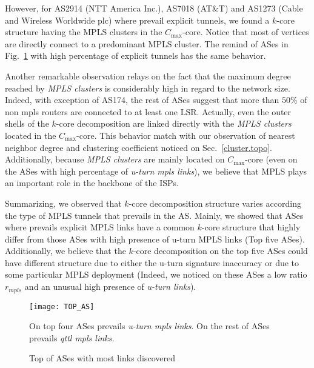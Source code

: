 However, for  AS2914 (NTT America Inc.), AS7018 (AT\&T) and AS1273 (Cable and
 Wireless Worldwide plc) where prevail explicit tunnels, we found a $k$-core
structure having the MPLS clusters in the $C_{\max}$-core. 
Notice that most of vertices are directly connect to a predominant MPLS cluster.
The remind of  ASes in Fig.~\ref{top_as} with high percentage of explicit tunnels has the same behavior.

Another remarkable observation  relays on the fact that the maximum degree
reached by \textit{MPLS clusters} is considerably high in regard to the network
size. Indeed, with exception of AS174, the rest of ASes suggest that more than
$50\%$ of non mpls routers are connected  to at least one LSR. Actually, even
the outer shells of the $k$-core decomposition are linked directly with the
\textit{MPLS clusters} located in the $C_{\max}$-core. This behavior match with
our observation of nearest neighbor degree and clustering coefficient noticed on
Sec.~\ref{cluster.topo}. Additionally, because \textit{MPLS clusters} are
mainly located on $C_{\max}$-core (even on the ASes with high percentage of
\textit{u-turn mpls links}), we believe that MPLS plays an important role in the
backbone of the ISPs.

Summarizing, we observed that  $k$-core decomposition structure varies according
the type of MPLS tunnels that prevails in the AS. Mainly, we showed that ASes where prevails 
explicit MPLS links have a common $k$-core structure that highly differ from those ASes with
high presence of u-turn MPLS links (Top five ASes). Additionally, we believe that the $k$-core decomposition  on the top five ASes could have different structure due to either  the
u-turn signature inaccuracy or due to some particular MPLS deployment (Indeed, we noticed on these
ASes a low ratio $r_{mpls}$ and an unusual  high presence of  \textit{u-turn links}).


\begin{figure}[!htb]
  \begin{center}
    \texttt{[image: TOP\_AS]}
  \end{center}
  \caption{Top of ASes with most links discovered} On top four ASes
  prevails \textit{u-turn mpls links}. On the rest of ASes prevails \textit{qttl
  mpls links.}
  \label{top_as}
\end{figure}


